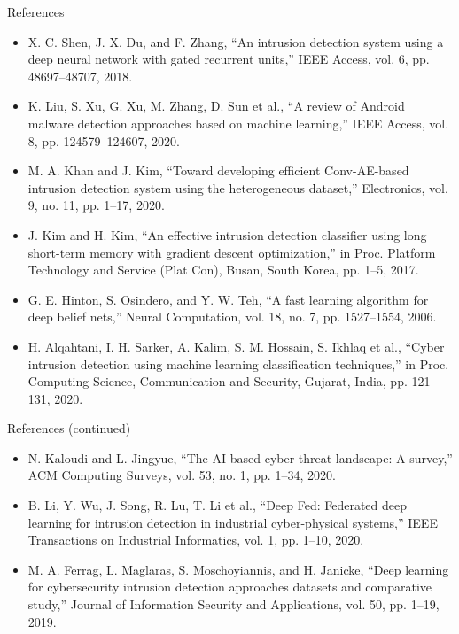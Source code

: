 \documentclass{beamer}
\begin{document}
\begin{frame}[allowframebreaks]{References}
  \tiny
  \begin{itemize}
    \item X. C. Shen, J. X. Du, and F. Zhang, “An intrusion detection system using a deep neural network with gated recurrent units,” IEEE Access, vol. 6, pp. 48697–48707, 2018.
    \item K. Liu, S. Xu, G. Xu, M. Zhang, D. Sun et al., “A review of Android malware detection approaches based on machine learning,” IEEE Access, vol. 8, pp. 124579–124607, 2020.
    \item M. A. Khan and J. Kim, “Toward developing efficient Conv-AE-based intrusion detection system using the heterogeneous dataset,” Electronics, vol. 9, no. 11, pp. 1–17, 2020.
  \end{itemize}
  
  \begin{itemize}
    \item J. Kim and H. Kim, “An effective intrusion detection classifier using long short-term memory with gradient descent optimization,” in Proc. Platform Technology and Service (Plat Con), Busan, South Korea, pp. 1–5, 2017.
    \item G. E. Hinton, S. Osindero, and Y. W. Teh, “A fast learning algorithm for deep belief nets,” Neural Computation, vol. 18, no. 7, pp. 1527–1554, 2006.
    \item H. Alqahtani, I. H. Sarker, A. Kalim, S. M. Hossain, S. Ikhlaq et al., “Cyber intrusion detection using machine learning classification techniques,” in Proc. Computing Science, Communication and Security, Gujarat, India, pp. 121–131, 2020.
  \end{itemize}
\end{frame}

\begin{frame}[allowframebreaks]{References (continued)}
  \tiny
  \begin{itemize}
    \item N. Kaloudi and L. Jingyue, “The AI-based cyber threat landscape: A survey,” ACM Computing Surveys, vol. 53, no. 1, pp. 1–34, 2020.
    \item B. Li, Y. Wu, J. Song, R. Lu, T. Li et al., “Deep Fed: Federated deep learning for intrusion detection in industrial cyber-physical systems,” IEEE Transactions on Industrial Informatics, vol. 1, pp. 1–10, 2020.
    \item M. A. Ferrag, L. Maglaras, S. Moschoyiannis, and H. Janicke, “Deep learning for cybersecurity intrusion detection approaches datasets and comparative study,” Journal of Information Security and Applications, vol. 50, pp. 1–19, 2019.
  \end{itemize}
\end{frame}
\end{document}
